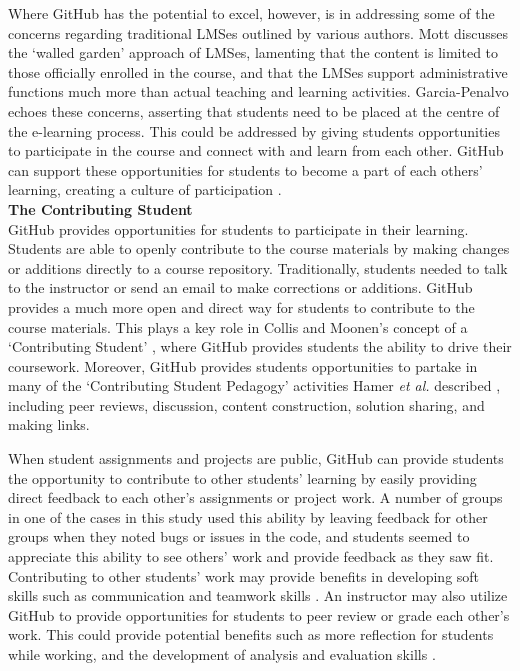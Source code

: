 Where GitHub has the potential to excel, however, is in addressing some of the concerns regarding traditional LMSes outlined by various authors. Mott \cite{mott2010envisioning} discusses the `walled garden' approach of LMSes, lamenting that the content is limited to those officially enrolled in the course, and that the LMSes support administrative functions much more than actual teaching and learning activities. Garcia-Penalvo \cite{garcia2011opening} echoes these concerns, asserting that students need to be placed at the centre of the e-learning process. This could be addressed by giving students opportunities to participate in the course and connect with and learn from each other. GitHub can support these opportunities for students to become a part of each others' learning, creating a culture of participation \cite{jenkins2009confronting}. \\

\textbf{The Contributing Student} \\
GitHub provides opportunities for students to participate in their learning. Students are able to openly contribute to the course materials by making changes or additions directly to a course repository. Traditionally, students needed to talk to the instructor or send an email to make corrections or additions. GitHub provides a much more open and direct way for students to contribute to the course materials. This plays a key role in Collis and Moonen's concept of a `Contributing Student' \cite{collis2006contributing}, where GitHub provides students the ability to drive their coursework. Moreover, GitHub provides students opportunities to partake in many of the `Contributing Student Pedagogy' activities Hamer \textit{et al.} described \cite{hamer2011tools}, including peer reviews, discussion, content construction, solution sharing, and making links.

When student assignments and projects are public, GitHub can provide students the opportunity to contribute to other students' learning by easily providing direct feedback to each other's assignments or project work. A number of groups in one of the cases in this study used this ability by leaving feedback for other groups when they noted bugs or issues in the code, and students seemed to appreciate this ability to see others' work and provide feedback as they saw fit. Contributing to other students' work may provide benefits in developing soft skills such as communication and teamwork skills \cite{hamer2006some}. An instructor may also utilize GitHub to provide opportunities for students to peer review or grade each other's work. This could provide potential benefits such as more reflection for students while working, and the development of analysis and evaluation skills \cite{sondergaard2012collaborative}.

